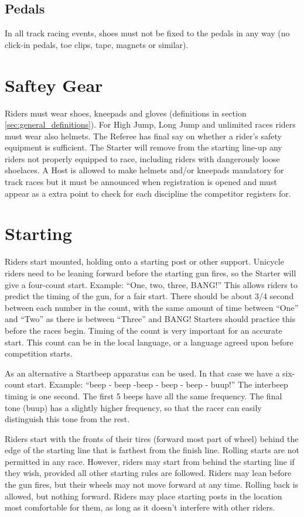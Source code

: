 \subsection{Pedals}
In all track racing events, shoes must not be fixed to the pedals in any way (no click-in pedals, toe clips, tape, magnets or similar).

\section{Saftey Gear}
Riders must wear shoes, kneepads and gloves (definitions in section \ref{sec:general_definitions}).
For High Jump, Long Jump and unlimited races riders must wear also helmets. The Referee has final say on whether a rider’s safety equipment is sufficient. The Starter will remove from the starting line-up any riders not properly equipped to race, including riders with dangerously loose shoelaces. A Host is allowed to make helmets and/or kneepads mandatory for track races but it must be announced when registration is opened and must appear as a extra point to check for each discipline the competitor registers for.

\section{Starting}
Riders start mounted, holding onto a starting post or other support.
Unicycle riders need to be leaning forward before the starting gun fires, so the Starter will give a four-count start.
Example: ``One, two, three, BANG!'' This allows riders to predict the timing of the gun, for a fair start.
There should be about 3/4 second between each number in the count, with the same amount of time between ``One'' and ``Two'' as there is between ``Three'' and BANG! Starters should practice this before the races begin.
Timing of the count is very important for an accurate start.
This count can be in the local language, or a language agreed upon before competition starts.

As an alternative a Startbeep apparatus can be used.
In that case we have a six-count start.
Example: ``beep - beep -beep - beep - beep - buup!'' The interbeep timing is one second.
The first 5 beeps have all the same frequency.
The final tone (buup) has a slightly higher frequency, so that the racer can easily distinguish this tone from the rest.

Riders start with the fronts of their tires (forward most part of wheel) behind the edge of the starting line that is farthest from the finish line.
Rolling starts are not permitted in any race.
However, riders may start from behind the starting line if they wish, provided all other starting rules are followed.
Riders may lean before the gun fires, but their wheels may not move forward at any time.
Rolling back is allowed, but nothing forward.
Riders may place starting posts in the location most comfortable for them, as long as it doesn't interfere with other riders.

